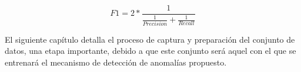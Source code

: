 \begin{equation}
F1 = 2*\frac{1}{\frac{1}{Precision}+\frac{1}{Recall}}
\end{equation}




El siguiente cap\'{i}tulo detalla el proceso de captura y preparaci\'{o}n del conjunto de datos, una etapa importante, debido a que este conjunto ser\'{a} aquel con el que se entrenar\'{a} el mecanismo de detecci\'{o}n de anomal\'{i}as propuesto.
